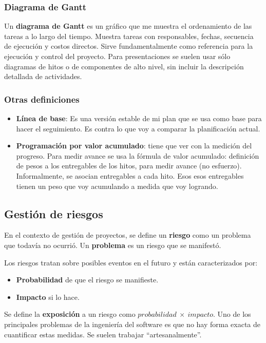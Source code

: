 \documentclass[]{article}
\begin{document}
\subsubsection{Diagrama de Gantt}
Un \textbf{diagrama de Gantt} es un gráfico que me muestra el ordenamiento de las tareas a lo largo del tiempo. Muestra tareas con responsables, fechas, secuencia de ejecución y costos directos. Sirve fundamentalmente como referencia para la ejecución y control del proyecto. Para presentaciones se suelen usar sólo diagramas de hitos o de componentes de alto nivel, sin incluir la descripción detallada de actividades.


\subsubsection{Otras definiciones}
\begin{itemize}
	\item \textbf{Línea de base}: Es una versión estable de mi plan que se usa como base para hacer el seguimiento. Es contra lo que voy a comparar la planificación actual.
	\item \textbf{Programación por valor acumulado}: tiene que ver con la medición del progreso. Para medir avance se usa la fórmula de valor acumulado: definición de pesos a los entregables de los hitos, para medir avance (no esfuerzo). Informalmente, se asocian entregables a cada hito. Esos esos entregables tienen un peso que voy acumulando a medida que voy logrando.
\end{itemize}

\subsection{Gestión de riesgos}
En el contexto de gestión de proyectos, se define un \textbf{riesgo} como un problema que todavía no ocurrió. Un \textbf{problema} es un riesgo que se manifestó.

Los riesgos tratan sobre posibles eventos en el futuro y están caracterizados por:
\begin{itemize}
	\item \textbf{Probabilidad} de que el riesgo se manifieste.
	\item \textbf{Impacto} si lo hace.
\end{itemize}

Se define la \textbf{exposición} a un riesgo como $probabilidad\ \times\ impacto$. Uno de los principales problemas de la ingeniería del software es que no hay forma exacta de cuantificar estas medidas. Se suelen trabajar ``artesanalmente''.
\end{document}
